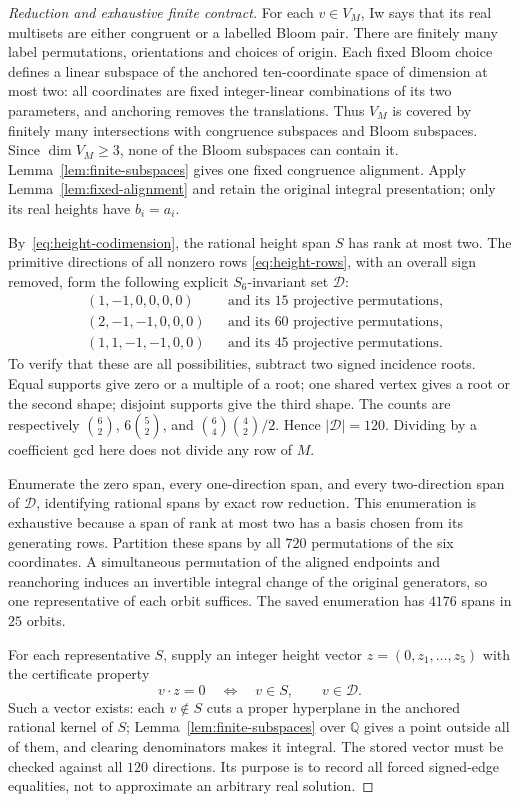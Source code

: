 \begin{proof}[Reduction and exhaustive finite contract]
For each $v\in V_M$, Iw says that its real multisets are either congruent
or a labelled Bloom pair. There are finitely many label permutations,
orientations and choices of origin. Each fixed Bloom choice defines a
linear subspace of the anchored ten-coordinate space of dimension at
most two: all coordinates are fixed integer-linear combinations of
its two parameters, and anchoring removes the translations. Thus $V_M$
is covered by finitely many intersections with congruence subspaces and
Bloom subspaces. Since $\dim V_M\ge3$, none of the Bloom subspaces can
contain it. Lemma~\ref{lem:finite-subspaces} gives one fixed congruence
alignment. Apply Lemma~\ref{lem:fixed-alignment} and retain the original
integral presentation; only its real heights have $b_i=a_i$.

By~\eqref{eq:height-codimension}, the rational height span $S$ has
rank at most two. The primitive directions of all nonzero rows
\eqref{eq:height-rows}, with an overall sign removed, form the following
explicit $S_6$-invariant set $\mathcal D$:
\begin{align*}
 &(1,-1,0,0,0,0) &&\text{and its $15$ projective permutations},\\
 &(2,-1,-1,0,0,0) &&\text{and its $60$ projective permutations},\\
 &(1,1,-1,-1,0,0) &&\text{and its $45$ projective permutations}.
\end{align*}
To verify that these are all possibilities, subtract two signed
incidence roots. Equal supports give zero or a multiple of a root;
one shared vertex gives a root or the second shape; disjoint supports
give the third shape. The counts are respectively $\binom62$,
$6\binom52$, and $\binom64\binom42/2$. Hence $|\mathcal D|=120$.
Dividing by a coefficient gcd here does not divide any row of $M$.

Enumerate the zero span, every one-direction span, and every two-direction
span of $\mathcal D$, identifying rational spans by exact row reduction.
This enumeration is exhaustive because a span of rank at most two has
a basis chosen from its generating rows. Partition these spans by all
$720$ permutations of the six coordinates. A simultaneous permutation
of the aligned endpoints and reanchoring induces an invertible integral
change of the original generators, so one representative of each orbit
suffices. The saved enumeration has $4176$ spans in $25$ orbits.

For each representative $S$, supply an integer height vector
$z=(0,z_1,\ldots,z_5)$ with the certificate property
\begin{equation}\label{eq:generic-height-contract}
 v\cdot z=0\quad\Longleftrightarrow\quad v\in S,
 \qquad v\in\mathcal D.
\end{equation}
Such a vector exists: each $v\notin S$ cuts a proper hyperplane in the
anchored rational kernel of $S$; Lemma~\ref{lem:finite-subspaces} over
$\mathbb Q$ gives a point outside all of them, and clearing denominators
makes it integral. The stored vector must be checked against all $120$
directions. Its purpose is to record all forced signed-edge equalities,
not to approximate an arbitrary real solution.


\end{proof}
